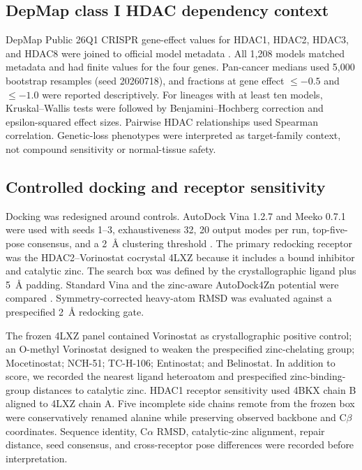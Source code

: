 \subsection{DepMap class I HDAC dependency context}

DepMap Public 26Q1 CRISPR gene-effect values for HDAC1, HDAC2, HDAC3, and HDAC8 were joined to official model metadata \cite{tsherniak2017}. All 1,208 models matched metadata and had finite values for the four genes. Pan-cancer medians used 5,000 bootstrap resamples (seed 20260718), and fractions at gene effect $\leq-0.5$ and $\leq-1.0$ were reported descriptively. For lineages with at least ten models, Kruskal--Wallis tests were followed by Benjamini--Hochberg correction and epsilon-squared effect sizes. Pairwise HDAC relationships used Spearman correlation. Genetic-loss phenotypes were interpreted as target-family context, not compound sensitivity or normal-tissue safety.

\subsection{Controlled docking and receptor sensitivity}

Docking was redesigned around controls. AutoDock Vina 1.2.7 and Meeko 0.7.1 were used with seeds 1--3, exhaustiveness 32, 20 output modes per run, top-five-pose consensus, and a 2~\AA{} clustering threshold \cite{trott2010,eberhardt2021}. The primary redocking receptor was the HDAC2--Vorinostat cocrystal 4LXZ because it includes a bound inhibitor and catalytic zinc. The search box was defined by the crystallographic ligand plus 5~\AA{} padding. Standard Vina and the zinc-aware AutoDock4Zn potential were compared \cite{santosmartins2014}. Symmetry-corrected heavy-atom RMSD was evaluated against a prespecified 2~\AA{} redocking gate.

The frozen 4LXZ panel contained Vorinostat as crystallographic positive control; an O-methyl Vorinostat designed to weaken the prespecified zinc-chelating group; Mocetinostat; NCH-51; TC-H-106; Entinostat; and Belinostat. In addition to score, we recorded the nearest ligand heteroatom and prespecified zinc-binding-group distances to catalytic zinc. HDAC1 receptor sensitivity used 4BKX chain B aligned to 4LXZ chain A. Five incomplete side chains remote from the frozen box were conservatively renamed alanine while preserving observed backbone and C$\beta$ coordinates. Sequence identity, C$\alpha$ RMSD, catalytic-zinc alignment, repair distance, seed consensus, and cross-receptor pose differences were recorded before interpretation.

